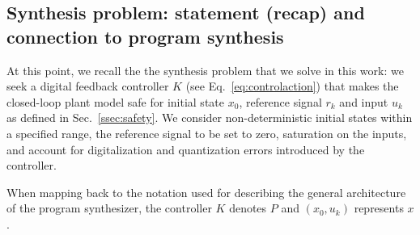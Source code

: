 \documentclass[runningheads,a4paper]{llncs}
\begin{document}
\subsection{Synthesis problem: statement (recap) and connection to program synthesis}


At this point, we recall the the synthesis problem that we solve in this
work: we seek a digital feedback controller $K$ (see
Eq.~\ref{eq:controlaction}) that makes the closed-loop plant model safe for
initial state $x_0$, reference signal $r_k$ and input $u_k$ as defined in
Sec.~\ref{ssec:safety}.  We consider non-deterministic initial states within
a specified range, the reference signal to be set to zero, saturation on the
inputs, and account for digitalization and quantization errors introduced by
the controller.

When mapping back to the notation used for describing the general
architecture of the program synthesizer, the controller $K$ denotes $P$ and
$(x_0, u_k)$ represents $x$.



\end{document}
